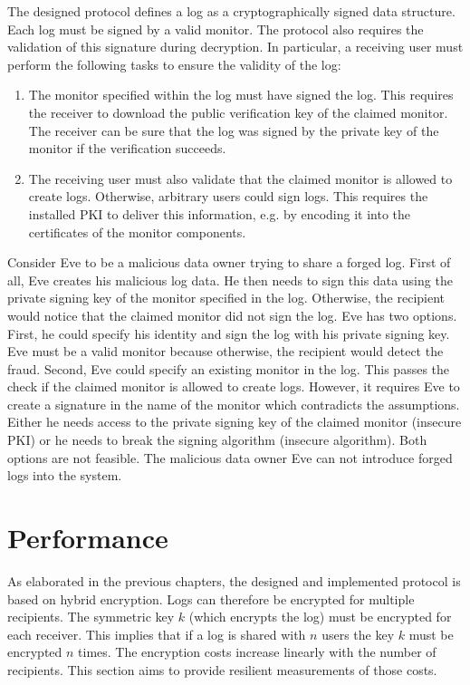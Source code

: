 \documentclass[../main.tex]{subfiles}
\begin{document}
The designed protocol defines a log as a cryptographically signed data structure.
Each log must be signed by a valid monitor.
The protocol also requires the validation of this signature during decryption.
In particular, a receiving user must perform the following tasks to ensure the validity of the log:
\begin{enumerate}
    \item 
    The monitor specified within the log must have signed the log.
    This requires the receiver to download the public verification key of the claimed monitor.
    The receiver can be sure that the log was signed by the private key of the monitor if the verification succeeds.
    \item 
    The receiving user must also validate that the claimed monitor is allowed to create logs.
    Otherwise, arbitrary users could sign logs.
    This requires the installed PKI to deliver this information, e.g. by encoding it into the certificates of the monitor components.
\end{enumerate}

Consider Eve to be a malicious data owner trying to share a forged log.
First of all, Eve creates his malicious log data.
He then needs to sign this data using the private signing key of the monitor specified in the log.
Otherwise, the recipient would notice that the claimed monitor did not sign the log.
Eve has two options.
First, he could specify his identity and sign the log with his private signing key.
Eve must be a valid monitor because otherwise, the recipient would detect the fraud.
Second, Eve could specify an existing monitor in the log.
This passes the check if the claimed monitor is allowed to create logs.
However, it requires Eve to create a signature in the name of the monitor which contradicts the assumptions.
Either he needs access to the private signing key of the claimed monitor (insecure PKI) or he needs to break the signing algorithm (insecure algorithm).
Both options are not feasible.
The malicious data owner Eve can not introduce forged logs into the system.

\section{Performance}
\label{sec:evaluation-perf}
As elaborated in the previous chapters, the designed and implemented protocol is based on hybrid encryption.
Logs can therefore  be encrypted for multiple recipients.
The symmetric key $k$ (which encrypts the log) must be encrypted for each receiver.
This implies that if a log is shared with $n$ users the key $k$ must be encrypted $n$ times.
The encryption costs increase linearly with the number of recipients.
This section aims to provide resilient measurements of those costs.
\end{document}
